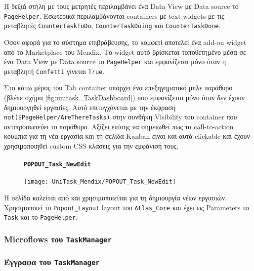                 Η δεξιά στήλη με τους μετρητές περιλαμβάνει ένα Data View με Data source το \texttt{PageHelper}. Εσωτερικά περιλαμβάνονται containers με text widgets με τις μεταβλητές \texttt{CounterTaskToDo}, \texttt{CounterTaskDoing} και \texttt{CounterTaskDone}.

                Όσον αφορά για το σύστημα επιβράβευσης, το κομφετί αποτελεί ένα add-on widget από το Marketplace του Mendix. Το widget αυτό βρίσκεται τοποθετημένο μέσα σε ένα Data View με Data source το \texttt{PageHelper} και εμφανίζεται μόνο όταν η μεταβλητή \texttt{Confetti} γίνεται \texttt{True}.

                Στο κάτω μέρος του Tab container υπάρχει ένα επεξηγηματικό μπλε παράθυρο (βλέπε σχήμα \ref{fig:unitask_TaskDashboard}) που εμφανίζεται μόνο όταν δεν έχουν δημιουργηθεί εργασίες. Αυτό επιτυγχάνεται με την έκφραση \verb|not($PageHelper/AreThereTasks)| στην συνθήκη Visibility του container που αντιπροσωπεύει το παράθυρο. Αξίζει επίσης να σημειωθεί πως τα call-to-action κουμπιά για τη νέα εργασία και τη σελίδα Kanban είναι και αυτά clickable και έχουν χρησιμοποιηθεί custom CSS κλάσεις για την εμφάνισή τους.

                \begin{figure}[H] \noindent
                    \paragraph{\texttt{POPOUT\_Task\_NewEdit}}
                    \begin{center}
                        \texttt{[image: UniTask\_Mendix/POPOUT\_Task\_NewEdit]}
                    \end{center}
                \end{figure}

                Η σελίδα καλείται από και χρησιμοποιείται για τη δημιουργία νέων εργασιών. Χρησιμοποιεί το \texttt{Popout\_Layout} layout του \texttt{Atlas\_Core} και έχει ως Parameters το \texttt{Task} και το \texttt{PageHelper}.



            \subsubsection{Microflows του \texttt{TaskManager}}

            \subsubsection{Έγγραφα του \texttt{TaskManager}}